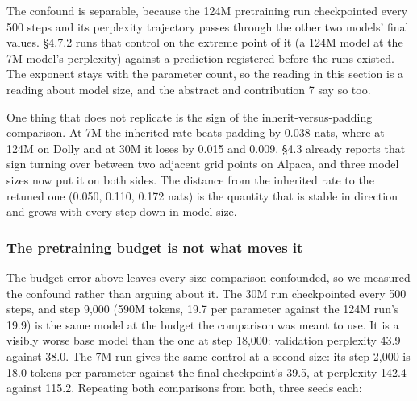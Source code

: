 \documentclass[11pt]{article}
\begin{document}
The confound is separable, because the 124M pretraining run checkpointed every 500 steps and its perplexity trajectory passes through the other two models' final values. \S{}4.7.2 runs that control on the extreme point of it (a 124M model at the 7M model's perplexity) against a prediction registered before the runs existed. The exponent stays with the parameter count, so the reading in this section is a reading about model size, and the abstract and contribution 7 say so too.

One thing that does not replicate is the sign of the inherit-versus-padding comparison. At 7M the inherited rate beats padding by 0.038 nats, where at 124M on Dolly and at 30M it loses by 0.015 and 0.009. \S{}4.3 already reports that sign turning over between two adjacent grid points on Alpaca, and three model sizes now put it on both sides. The distance from the inherited rate to the retuned one (0.050, 0.110, 0.172 nats) is the quantity that is stable in direction and grows with every step down in model size.

\subsubsection{The pretraining budget is not what moves it}

The budget error above leaves every size comparison confounded, so we measured the confound rather than arguing about it. The 30M run checkpointed every 500 steps, and step 9,000 (590M tokens, 19.7 per parameter against the 124M run's 19.9) is the same model at the budget the comparison was meant to use. It is a visibly worse base model than the one at step 18,000: validation perplexity 43.9 against 38.0. The 7M run gives the same control at a second size: its step 2,000 is 18.0 tokens per parameter against the final checkpoint's 39.5, at perplexity 142.4 against 115.2. Repeating both comparisons from both, three seeds each:
\end{document}
